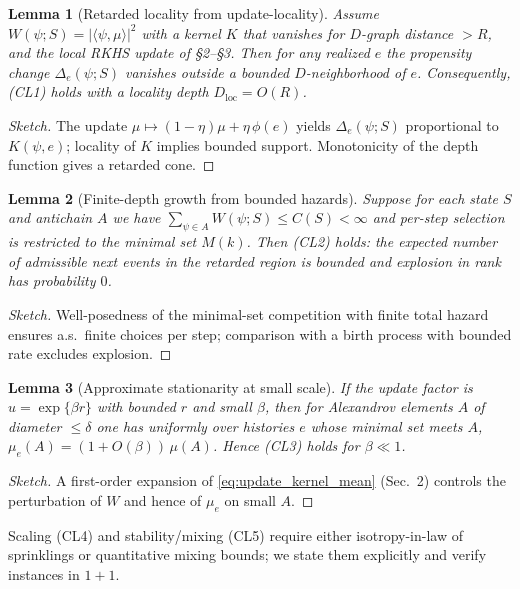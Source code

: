 \documentclass[12pt,a4paper]{article}
\newtheorem{lemma}{Lemma}
\begin{document}
\begin{lemma}[Retarded locality from update-locality]
Assume $W(\psi;S)=|\langle\psi,\mu\rangle|^2$ with a kernel $K$ that vanishes for $D$-graph distance $>R$,
and the local RKHS update of \S2--\S3. Then for any realized $e$ the propensity change
$\Delta_e(\psi;S)$ vanishes outside a bounded $D$-neighborhood of $e$. Consequently, {\normalfont (CL1)} holds
with a locality depth $D_{\mathrm{loc}}=O(R)$.
\end{lemma}

\begin{proof}[Sketch]
The update $\mu\mapsto(1-\eta)\mu+\eta\,\phi(e)$ yields $\Delta_e(\psi;S)$ proportional to $K(\psi,e)$;
locality of $K$ implies bounded support. Monotonicity of the depth function gives a retarded cone.
\end{proof}

\begin{lemma}[Finite-depth growth from bounded hazards]
Suppose for each state $S$ and antichain $A$ we have $\sum_{\psi\in A} W(\psi;S)\le C(S) < \infty$ and
per-step selection is restricted to the minimal set $M(k)$. Then {\normalfont (CL2)} holds: the expected
number of admissible next events in the retarded region is bounded and explosion in rank has probability $0$.
\end{lemma}

\begin{proof}[Sketch]
Well-posedness of the minimal-set competition with finite total hazard ensures a.s.\ finite choices per step;
comparison with a birth process with bounded rate excludes explosion.
\end{proof}

\begin{lemma}[Approximate stationarity at small scale]
If the update factor is $u=\exp\{\beta r\}$ with bounded $r$ and small $\beta$, then for Alexandrov elements
$A$ of diameter $\le \delta$ one has uniformly over histories $e$ whose minimal set meets $A$,
$\mu_e(A)=(1+O(\beta))\,\mu(A)$. Hence {\normalfont (CL3)} holds for $\beta\ll 1$.
\end{lemma}

\begin{proof}[Sketch]
A first-order expansion of \eqref{eq:update_kernel_mean} (Sec.~2) controls the perturbation of $W$ and hence of $\mu_e$ on small $A$.
\end{proof}

\noindent Scaling {\normalfont (CL4)} and stability/mixing {\normalfont (CL5)} require either isotropy-in-law of sprinklings or
quantitative mixing bounds; we state them explicitly and verify instances in $1{+}1$.
\end{document}

